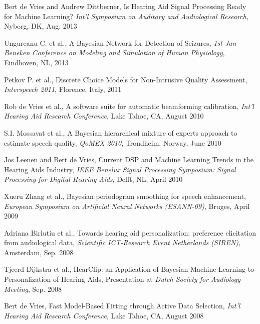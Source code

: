 
\begin{etaremune}

\item Bert de Vries and Andrew Dittberner, Is Hearing Aid Signal Processing Ready for Machine Learning? \emph{Int'l Symposium on Auditory and Audiological Research}, Nyborg, DK, Aug. 2013

\item Ungureanu C. et al., A Bayesian Network for Detection of Seizures, \emph{1st Jan Beneken Conference on Modeling and Simulation of Human Physiology}, Eindhoven, NL, 2013

\item Petkov P. et al., Discrete Choice Models for Non-Intrusive Quality Assessment, \emph{Interspeech 2011}, Florence, Italy, 2011

\item Rob de Vries et al., A software suite for automatic beamforming calibration, \emph{Int'l Hearing Aid Research Conference}, Lake Tahoe, CA, August 2010

\item S.I. Mossavat et al., A Bayesian hierarchical mixture of experts approach to estimate speech quality, \emph{QoMEX 2010},  Trondheim, Norway, June 2010

\item Jos Leenen and Bert de Vries, Current DSP and Machine Learning Trends in the Hearing Aids Industry,  \emph{IEEE Benelux Signal Processing Symposium: Signal Processing for Digital Hearing Aids}, Delft, NL, April 2010

\item Xueru Zhang et al., Bayesian periodogram smoothing for speech enhancement, \emph{European Symposium on Artificial Neural Networks (ESANN-09)}, Bruges, April 2009

\item Adriana Birlutiu et al., Towards hearing aid personalization: preference elicitation from audiological data, \emph{Scientific ICT-Research Event Netherlands (SIREN)}, Amsterdam, Sep. 2008

\item Tjeerd Dijkstra et al., HearClip: an Application of Bayesian Machine Learning to Personalization of Hearing Aids, Presentation at \emph{Dutch Society for Audiology Meeting}, Sep. 2008

\item Bert de Vries, Fast Model-Based Fitting through Active Data Selection, \emph{Int'l Hearing Aid Research Conference}, Lake Tahoe, CA, August 2008


\end{etaremune}
